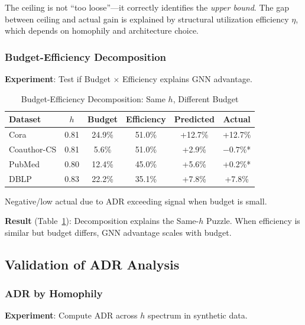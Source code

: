 The ceiling is not ``too loose''---it correctly identifies the \textit{upper bound}. The gap between ceiling and actual gain is explained by structural utilization efficiency $\eta$, which depends on homophily and architecture choice.

\subsubsection{Budget-Efficiency Decomposition}

\textbf{Experiment}: Test if Budget $\times$ Efficiency explains GNN advantage.

\begin{table}[t]
\centering
\caption{Budget-Efficiency Decomposition: Same $h$, Different Budget}
\label{tab:budget_efficiency_decomp}
\begin{tabular}{@{}lccccc@{}}
\toprule
\textbf{Dataset} & \textbf{$h$} & \textbf{Budget} & \textbf{Efficiency} & \textbf{Predicted} & \textbf{Actual} \\
\midrule
Cora & 0.81 & 24.9\% & 51.0\% & +12.7\% & +12.7\% \\
Coauthor-CS & 0.81 & 5.6\% & 51.0\% & +2.9\% & $-0.7\%$* \\
\midrule
PubMed & 0.80 & 12.4\% & 45.0\% & +5.6\% & +0.2\%* \\
DBLP & 0.83 & 22.2\% & 35.1\% & +7.8\% & +7.8\% \\
\bottomrule
\end{tabular}
\vspace{1mm}
\raggedright\small *Negative/low actual due to ADR exceeding signal when budget is small.
\end{table}

\textbf{Result} (Table~\ref{tab:budget_efficiency_decomp}): Decomposition explains the Same-$h$ Puzzle. When efficiency is similar but budget differs, GNN advantage scales with budget.

\subsection{Validation of ADR Analysis}

\subsubsection{ADR by Homophily}

\textbf{Experiment}: Compute ADR across $h$ spectrum in synthetic data.

